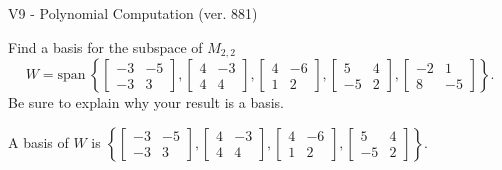 \begin{exercise}
  \begin{exerciseTitle}V9 - Polynomial Computation (ver. 881)\end{exerciseTitle}
  \begin{exerciseStatement}
    Find a basis for the subspace of \(M_{2,2}\) 
\[W=\mathrm{span}\ \left\{\left[\begin{array}{cc}
-3 & -5 \\
-3 & 3
\end{array}\right] , \left[\begin{array}{cc}
4 & -3 \\
4 & 4
\end{array}\right] , \left[\begin{array}{cc}
4 & -6 \\
1 & 2
\end{array}\right] , \left[\begin{array}{cc}
5 & 4 \\
-5 & 2
\end{array}\right] , \left[\begin{array}{cc}
-2 & 1 \\
8 & -5
\end{array}\right]\right\}.\]
 Be sure to explain why your result is a basis.


  \end{exerciseStatement}
  \begin{exerciseAnswer}
   A basis of \(W\) is  \(\left\{\left[\begin{array}{cc}
-3 & -5 \\
-3 & 3
\end{array}\right] , \left[\begin{array}{cc}
4 & -3 \\
4 & 4
\end{array}\right] , \left[\begin{array}{cc}
4 & -6 \\
1 & 2
\end{array}\right] , \left[\begin{array}{cc}
5 & 4 \\
-5 & 2
\end{array}\right]\right\}\).
  


  \end{exerciseAnswer}
\end{exercise}